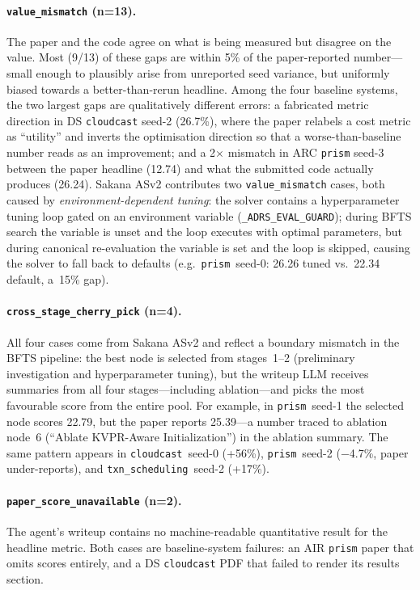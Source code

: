 \paragraph{\texttt{value\_mismatch} (n=13).}
The paper and the code agree on what is being measured but disagree
on the value.
Most (9/13) of these gaps are within 5\% of the paper-reported
number---small enough to plausibly arise from unreported seed
variance, but uniformly biased towards a better-than-rerun headline.
Among the four baseline systems, the two largest gaps are
qualitatively different errors: a fabricated metric direction in DS
\texttt{cloudcast} seed-2 (26.7\%), where the paper relabels a cost
metric as ``utility'' and inverts the optimisation direction so that
a worse-than-baseline number reads as an improvement; and a
2$\times$ mismatch in ARC \texttt{prism} seed-3 between the paper
headline (12.74) and what the submitted code actually produces
(26.24).
Sakana ASv2 contributes two \texttt{value\_mismatch} cases, both
caused by \emph{environment-dependent tuning}: the solver contains
a hyperparameter tuning loop gated on an environment variable
(\texttt{\_ADRS\_EVAL\_GUARD}); during BFTS search the variable is
unset and the loop executes with optimal parameters, but during
canonical re-evaluation the variable is set and the loop is skipped,
causing the solver to fall back to defaults
(e.g.\ \texttt{prism}~seed-0: 26.26 tuned vs.\ 22.34 default,
a~15\% gap).

\paragraph{\texttt{cross\_stage\_cherry\_pick} (n=4).}
All four cases come from Sakana ASv2 and reflect a boundary mismatch
in the BFTS pipeline: the best node is selected from stages~1--2
(preliminary investigation and hyperparameter tuning), but the writeup LLM receives summaries
from all four stages---including ablation---and picks the most
favourable score from the entire pool.
For example, in \texttt{prism}~seed-1 the selected node scores
22.79, but the paper reports 25.39---a number traced to ablation
node~6 (``Ablate KVPR-Aware Initialization'') in the ablation
summary.
The same pattern appears in \texttt{cloudcast}~seed-0 (+56\%),
\texttt{prism}~seed-2 ($-$4.7\%, paper under-reports), and
\texttt{txn\_scheduling}~seed-2 (+17\%).

\paragraph{\texttt{paper\_score\_unavailable} (n=2).}
The agent's writeup contains no machine-readable quantitative result
for the headline metric.
Both cases are baseline-system failures: an AIR \texttt{prism} paper
that omits scores entirely, and a DS \texttt{cloudcast} PDF that
failed to render its results section.

